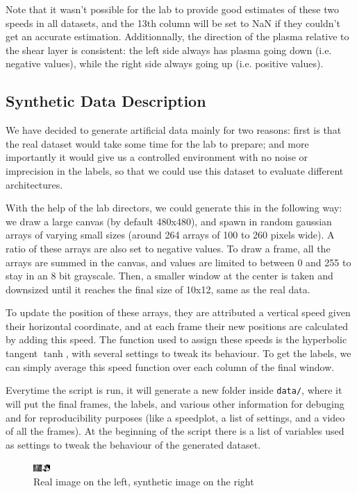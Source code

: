 \documentclass[10pt,conference]{IEEEtran}
\begin{document}
Note that it wasn't possible for the lab to provide good estimates of these two speeds in all datasets, and the 13th column will be set to NaN if they couldn't get an accurate estimation. 
Additionnally, the direction of the plasma relative to the shear layer is consistent: the left side always has plasma going down (i.e. negative values), while the right side always going up (i.e. positive values). 

\subsection{Synthetic Data Description}
We have decided to generate artificial data mainly for two reasons: first is that the real dataset would take some time for the lab to prepare; and more importantly it would give us a controlled environment with no noise or imprecision in the labels, so that we could use this dataset to evaluate different architectures.\par
With the help of the lab directors, we could generate this in the following way: we draw a large canvas (by default 480x480), and spawn in random gaussian arrays of varying small sizes (around 264 arrays of 100 to 260 pixels wide). A ratio of these arrays are also set to negative values. To draw a frame, all the arrays are summed in the canvas, and values are limited to between 0 and 255 to stay in an 8 bit grayscale. Then, a smaller window at the center is taken and downsized until it reaches the final size of 10x12, same as the real data.\par
To update the position of these arrays, they are attributed a vertical speed given their horizontal coordinate, and at each frame their new positions are calculated by adding this speed. The function used to assign these speeds is the hyperbolic tangent $\tanh$, with several settings to tweak its behaviour. To get the labels, we can simply average this speed function over each column of the final window.\par
Everytime the script is run, it will generate a new folder inside \texttt{data/}, where it will put the final frames, the labels, and various other information for debuging and for reproducibility purposes (like a speedplot, a list of settings, and a video of all the frames).
At the beginning of the script there is a list of variables used as settings to tweak the behaviour of the generated dataset.
 
\begin{figure}
  \centering
  \includegraphics[scale=4]{images/comparison.png}
  \caption{Real image on the left, synthetic image on the right}
\end{figure}
 
\end{document}
